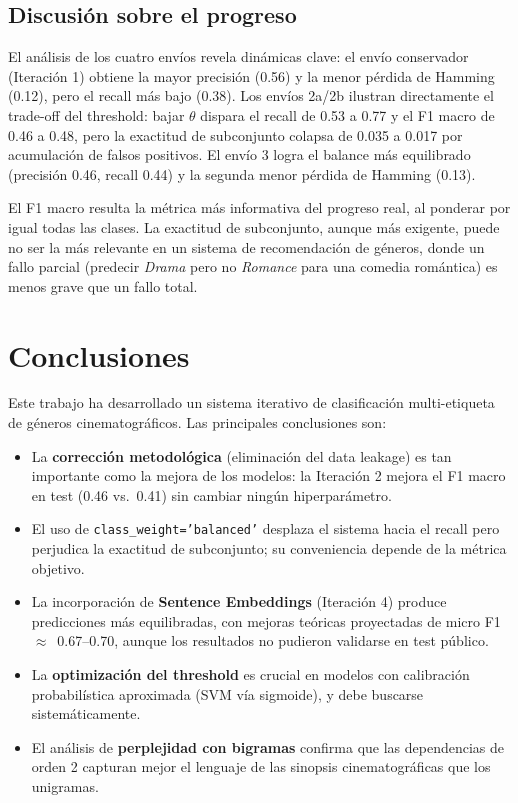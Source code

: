 \documentclass[11pt, a4paper]{article}
\begin{document}
\subsection{Discusión sobre el progreso}

El análisis de los cuatro envíos revela dinámicas clave: el envío conservador (Iteración 1) obtiene la mayor precisión (0.56) y la menor pérdida de Hamming (0.12), pero el recall más bajo (0.38). Los envíos 2a/2b ilustran directamente el trade-off del threshold: bajar $\theta$ dispara el recall de 0.53 a 0.77 y el F1 macro de 0.46 a 0.48, pero la exactitud de subconjunto colapsa de 0.035 a 0.017 por acumulación de falsos positivos. El envío 3 logra el balance más equilibrado (precisión 0.46, recall 0.44) y la segunda menor pérdida de Hamming (0.13).

El F1 macro resulta la métrica más informativa del progreso real, al ponderar por igual todas las clases. La exactitud de subconjunto, aunque más exigente, puede no ser la más relevante en un sistema de recomendación de géneros, donde un fallo parcial (predecir \textit{Drama} pero no \textit{Romance} para una comedia romántica) es menos grave que un fallo total.

\section{Conclusiones}

Este trabajo ha desarrollado un sistema iterativo de clasificación multi-etiqueta de géneros cinematográficos. Las principales conclusiones son:

\begin{itemize}
  \item La \textbf{corrección metodológica} (eliminación del data leakage) es tan importante como la mejora de los modelos: la Iteración 2 mejora el F1 macro en test (0.46 vs.\ 0.41) sin cambiar ningún hiperparámetro.
  \item El uso de \texttt{class\_weight='balanced'} desplaza el sistema hacia el recall pero perjudica la exactitud de subconjunto; su conveniencia depende de la métrica objetivo.
  \item La incorporación de \textbf{Sentence Embeddings} (Iteración 4) produce predicciones más equilibradas, con mejoras teóricas proyectadas de micro F1 $\approx$~0.67--0.70, aunque los resultados no pudieron validarse en test público.
  \item La \textbf{optimización del threshold} es crucial en modelos con calibración probabilística aproximada (SVM vía sigmoide), y debe buscarse sistemáticamente.
  \item El análisis de \textbf{perplejidad con bigramas} confirma que las dependencias de orden 2 capturan mejor el lenguaje de las sinopsis cinematográficas que los unigramas.
\end{itemize}
\end{document}
